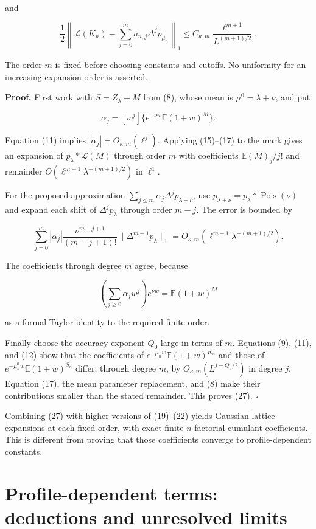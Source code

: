 \documentclass[
  11pt,
]{article}
\begin{document}
and

\[
\frac12\left\|\mathcal L(K_n)-
\sum_{j=0}^m a_{n,j}\Delta^jp_{\mu_n}\right\|_1
\le C_{\kappa,m}\frac{\ell^{m+1}}{L^{(m+1)/2}}.
\tag{27}
\]

The order \(m\) is fixed before choosing constants and cutoffs. No
uniformity for an increasing expansion order is asserted.

\textbf{Proof.} First work with \(S=Z_\lambda+M\) from (8), whose mean
is \(\mu^0=\lambda+\nu\), and put

\[
\alpha_j=[w^j]\{e^{-\nu w}\mathbb E(1+w)^M\}.
\]

Equation (11) implies \(|\alpha_j|=O_{\kappa,m}(\ell^j)\). Applying
(15)--(17) to the mark gives an expansion of \(p_\lambda*\mathcal L(M)\)
through order \(m\) with coefficients \(\mathbb E(M)_j/j!\) and
remainder \(O(\ell^{m+1}\lambda^{-(m+1)/2})\) in \(\ell^1\).

For the proposed approximation
\(\sum_{j\le m}\alpha_j\Delta^jp_{\lambda+\nu}\), use
\(p_{\lambda+\nu}=p_\lambda*\operatorname{Pois}(\nu)\) and expand each
shift of \(\Delta^jp_\lambda\) through order \(m-j\). The error is
bounded by

\[
\sum_{j=0}^m|\alpha_j|\frac{\nu^{m-j+1}}{(m-j+1)!}
\|\Delta^{m+1}p_\lambda\|_1
=O_{\kappa,m}(\ell^{m+1}\lambda^{-(m+1)/2}).
\]

The coefficients through degree \(m\) agree, because

\[
\left(\sum_{j\ge0}\alpha_j w^j\right)e^{\nu w}
=\mathbb E(1+w)^M
\]

as a formal Taylor identity to the required finite order.

Finally choose the accuracy exponent \(Q_0\) large in terms of \(m\).
Equations (9), (11), and (12) show that the coefficients of
\(e^{-\mu_n w}\mathbb E(1+w)^{K_n}\) and those of
\(e^{-\mu_n^0w}\mathbb E(1+w)^{S_n}\) differ, through degree \(m\), by
\(O_{\kappa,m}(L^{j-Q_0/2})\) in degree \(j\). Equation (17), the mean
parameter replacement, and (8) make their contributions smaller than the
stated remainder. This proves (27). \(\square\)

Combining (27) with higher versions of (19)--(22) yields Gaussian
lattice expansions at each fixed order, with exact finite-\(n\)
factorial-cumulant coefficients. This is different from proving that
those coefficients converge to profile-dependent constants.

\section{Profile-dependent terms: deductions and unresolved
limits}\label{profile-dependent-terms-deductions-and-unresolved-limits}
\end{document}
